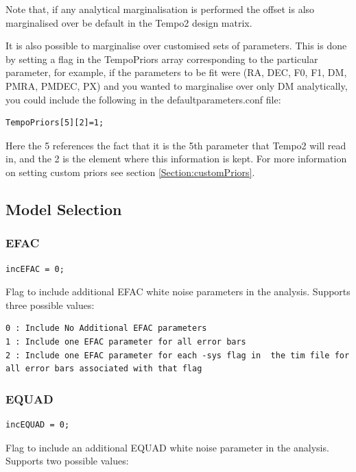 \documentclass[%
 preprint,
 amsmath,amssymb,amsfonts,
 aps,
]{revtex4-1}
\begin{document}
Note that, if any analytical marginalisation is performed the offset is also marginalised over be default in the Tempo2 design matrix.

It is also possible to marginalise over customised sets of parameters.  This is done by setting a flag in the TempoPriors array corresponding to the particular parameter, for example, if the parameters to be fit were (RA, DEC, F0, F1, DM, PMRA, PMDEC, PX) and you wanted to marginalise over only DM analytically, you could include the following in the defaultparameters.conf file:

\begin{lstlisting}
TempoPriors[5][2]=1;
\end{lstlisting}
%
Here the 5 references the fact that it is the 5th parameter that Tempo2 will read in, and the 2 is the element where this information is kept.  For more information on setting custom priors see section \ref{Section:customPriors}.

\subsection{Model Selection}

\subsubsection{EFAC}

\begin{lstlisting}
incEFAC = 0;
\end{lstlisting}

Flag to include additional EFAC white noise parameters in the analysis.  Supports three possible values:

\begin{lstlisting}
0 : Include No Additional EFAC parameters 
1 : Include one EFAC parameter for all error bars
2 : Include one EFAC parameter for each -sys flag in  the tim file for all error bars associated with that flag
\end{lstlisting}


\subsubsection{EQUAD}

\begin{lstlisting}
incEQUAD = 0;
\end{lstlisting}

Flag to include an additional EQUAD white noise parameter in the analysis.  Supports two possible values:
\end{document}
